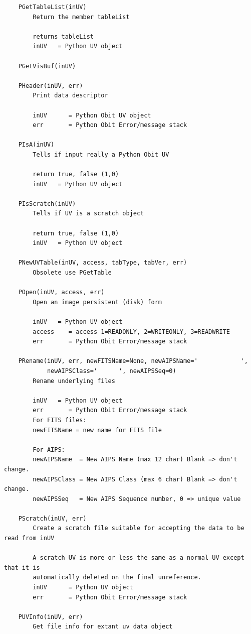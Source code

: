 \documentclass[11pt]{report}
\begin{document}
\begin{verbatim}
    PGetTableList(inUV)
        Return the member tableList
        
        returns tableList
        inUV   = Python UV object
    
    PGetVisBuf(inUV)
    
    PHeader(inUV, err)
        Print data descriptor
        
        inUV      = Python Obit UV object
        err       = Python Obit Error/message stack
    
    PIsA(inUV)
        Tells if input really a Python Obit UV
        
        return true, false (1,0)
        inUV   = Python UV object
    
    PIsScratch(inUV)
        Tells if UV is a scratch object
        
        return true, false (1,0)
        inUV   = Python UV object
    
    PNewUVTable(inUV, access, tabType, tabVer, err)
        Obsolete use PGetTable
    
    POpen(inUV, access, err)
        Open an image persistent (disk) form
        
        inUV   = Python UV object
        access    = access 1=READONLY, 2=WRITEONLY, 3=READWRITE
        err       = Python Obit Error/message stack
    
    PRename(inUV, err, newFITSName=None, newAIPSName='            ', 
            newAIPSClass='      ', newAIPSSeq=0)
        Rename underlying files
        
        inUV   = Python UV object
        err       = Python Obit Error/message stack
        For FITS files:
        newFITSName = new name for FITS file
        
        For AIPS:
        newAIPSName  = New AIPS Name (max 12 char) Blank => don't change.
        newAIPSClass = New AIPS Class (max 6 char) Blank => don't change.
        newAIPSSeq   = New AIPS Sequence number, 0 => unique value
    
    PScratch(inUV, err)
        Create a scratch file suitable for accepting the data to be read from inUV
        
        A scratch UV is more or less the same as a normal UV except that it is
        automatically deleted on the final unreference.
        inUV      = Python UV object
        err       = Python Obit Error/message stack
    
    PUVInfo(inUV, err)
        Get file info for extant uv data object
        

\end{verbatim}
\end{document}
